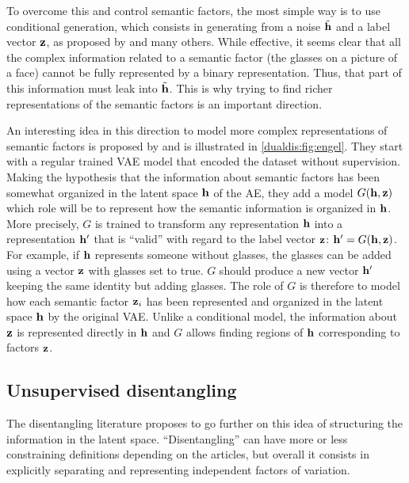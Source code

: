 To overcome this and control semantic factors, the most simple way is to use conditional generation, which consists in generating from a noise $\tilde{\mathbf{h}}$ and a label vector $\mathbf{z}$, as proposed by \citet{perarnau2016invertible,wang2018high,Bodla2018,he2019attgan} and many others. While effective, it seems clear that all the complex information related to a semantic factor (\eg the glasses on a picture of a face) cannot be fully represented by a binary representation. Thus, that part of this information must leak into $\tilde{\mathbf{h}}$. This is why trying to find richer representations of the semantic factors is an important direction.

An interesting idea in this direction to model more complex representations of semantic factors is proposed by \citet{engel2018latent} and is illustrated in \autoref{dualdis:fig:engel}. They start with a regular trained \ac{VAE} model that encoded the dataset without supervision. Making the hypothesis that the information about semantic factors has been somewhat organized in the latent space $\mathbf{h}$ of the \ac{AE}, they add a model $G(\mathbf{h}, \mathbf{z})$ which role will be to represent how the semantic information is organized in $\mathbf{h}$. More precisely, $G$ is trained to transform any representation $\mathbf{h}$ into a representation $\mathbf{h}'$ that is ``valid'' with regard to the label vector $\mathbf{z}$: $\mathbf{h}'=G(\mathbf{h},\mathbf{z})$. For example, if $\mathbf{h}$ represents someone without glasses, the glasses can be added using a vector $\mathbf{z}$ with glasses set to true. $G$ should produce a new vector $\mathbf{h}'$ keeping the same identity but adding glasses. The role of $G$ is therefore to model how each semantic factor $\mathbf{z}_i$ has been represented and organized in the latent space $\mathbf{h}$ by the original \ac{VAE}. Unlike a conditional model, the information about $\mathbf{z}$ is represented directly in $\mathbf{h}$ and $G$ allows finding regions of $\mathbf{h}$ corresponding to factors $\mathbf{z}$.

\subsection{Unsupervised disentangling}\label{dualdis:sec:RW_unsup}

The disentangling literature proposes to go further on this idea of structuring the information in the latent space. ``Disentangling'' can have more or less constraining definitions depending on the articles, but overall it consists in explicitly separating and representing independent factors of variation.

